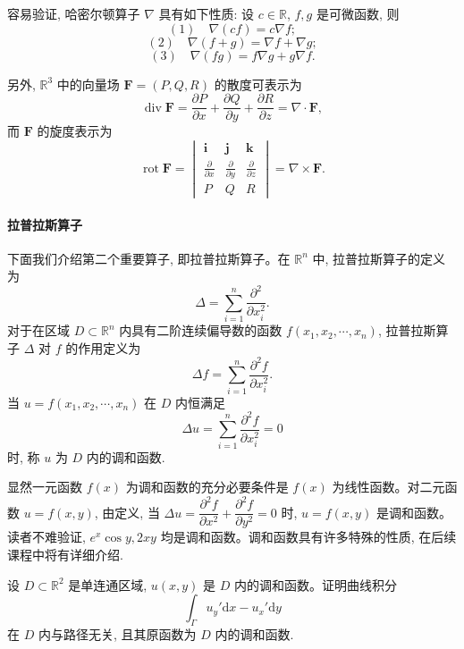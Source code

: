 容易验证, 哈密尔顿算子 $\nabla$ 具有如下性质: 设 $c\in\mathbb R$, $f,g$ 是可微函数, 则
\[
  (1)\quad \nabla(cf)=c\nabla f;
\]
\[
  (2)\quad \nabla(f+g)=\nabla f+\nabla g;
\]
\[
  (3)\quad \nabla(fg)=f\nabla g+g\nabla f.
\]

另外, $\mathbb R^3$ 中的向量场 $\boldsymbol F=(P,Q,R)$ 的散度可表示为
\[
  \operatorname{div}\boldsymbol F
  =
  \frac{\partial P}{\partial x}+\frac{\partial Q}{\partial y}+\frac{\partial R}{\partial z}
  =
  \nabla\cdot\boldsymbol F,
\]
而 $\boldsymbol F$ 的旋度表示为
\[
  \operatorname{rot}\boldsymbol F
  =
  \begin{vmatrix}
    \boldsymbol i&\boldsymbol j&\boldsymbol k\\
    \frac{\partial}{\partial x}&\frac{\partial}{\partial y}&\frac{\partial}{\partial z}\\
    P&Q&R
  \end{vmatrix}
  =
  \nabla\times\boldsymbol F.
\]

\paragraph*{拉普拉斯算子}


下面我们介绍第二个重要算子, 即拉普拉斯算子。在 $\mathbb R^n$ 中, 拉普拉斯算子的定义为
\[
  \Delta=\sum_{i=1}^n\frac{\partial^2}{\partial x_i^2}.
\]
对于在区域 $D\subset\mathbb R^n$ 内具有二阶连续偏导数的函数 $f(x_1,x_2,\cdots,x_n)$, 拉普拉斯算子 $\Delta$ 对 $f$ 的作用定义为
\[
  \Delta f=\sum_{i=1}^n\frac{\partial^2f}{\partial x_i^2}.
\]
当 $u=f(x_1,x_2,\cdots,x_n)$ 在 $D$ 内恒满足
\[
  \Delta u=\sum_{i=1}^n\frac{\partial^2f}{\partial x_i^2}=0
\]
时, 称 $u$ 为 $D$ 内的调和函数.

显然一元函数 $f(x)$ 为调和函数的充分必要条件是 $f(x)$ 为线性函数。对二元函数 $u=f(x,y)$, 由定义, 当 $\Delta u=\dfrac{\partial^2f}{\partial x^2}+\dfrac{\partial^2f}{\partial y^2}=0$ 时, $u=f(x,y)$ 是调和函数。读者不难验证, $e^x\cos y,2xy$ 均是调和函数。调和函数具有许多特殊的性质, 在后续课程中将有详细介绍.

\begin{example}\label{example:ma-16-8-2}
设 $D\subset\mathbb R^2$ 是单连通区域, $u(x,y)$ 是 $D$ 内的调和函数。证明曲线积分
\[
  \int_\Gamma u_y'\mathrm dx-u_x'\mathrm dy
\]
在 $D$ 内与路径无关, 且其原函数为 $D$ 内的调和函数.
\end{example}


